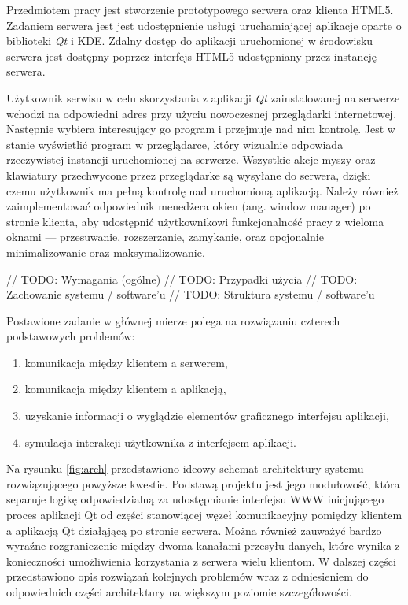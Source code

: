 Przedmiotem pracy jest stworzenie prototypowego serwera oraz klienta HTML5. Zadaniem serwera jest jest udostępnienie usługi uruchamiającej aplikacje oparte o biblioteki \emph{Qt} i KDE. Zdalny dostęp do aplikacji uruchomionej w środowisku serwera jest dostępny poprzez interfejs HTML5 udostępniany przez instancję serwera.

Użytkownik serwisu w celu skorzystania z aplikacji \emph{Qt} zainstalowanej na serwerze wchodzi na odpowiedni adres przy użyciu nowoczesnej przeglądarki internetowej. Następnie wybiera interesujący go program i przejmuje nad nim kontrolę. Jest w stanie wyświetlić program w przeglądarce, który wizualnie odpowiada rzeczywistej instancji uruchomionej na serwerze. Wszystkie akcje myszy oraz klawiatury przechwycone przez przeglądarke są wysyłane do serwera, dzięki czemu użytkownik ma pełną kontrolę nad uruchomioną aplikacją. Należy również zaimplementować odpowiednik menedżera okien (ang. window manager) po stronie klienta, aby udostępnić użytkownikowi funkcjonalność pracy z wieloma oknami --- przesuwanie, rozszerzanie, zamykanie, oraz opcjonalnie minimalizowanie oraz maksymalizowanie.

// TODO: Wymagania (ogólne)
// TODO: Przypadki użycia
// TODO: Zachowanie systemu / software'u
// TODO: Struktura systemu / software'u

Postawione zadanie w głównej mierze polega na rozwiązaniu czterech podstawowych problemów:
\begin{enumerate}
  \item komunikacja między klientem a serwerem,
  \item komunikacja między klientem a aplikacją,
  \item uzyskanie informacji o wyglądzie elementów graficznego interfejsu aplikacji,
  \item symulacja interakcji użytkownika z interfejsem aplikacji.
\end{enumerate}

Na rysunku \ref{fig:arch} przedstawiono ideowy schemat architektury systemu rozwiązującego powyższe kwestie. 
Podstawą projektu jest jego modułowość, która separuje logikę odpowiedzialną za udostępnianie interfejsu WWW inicjującego proces aplikacji Qt od części stanowiącej węzeł komunikacyjny pomiędzy klientem a aplikacją Qt działąjącą po stronie serwera.
Można również zauważyć bardzo wyraźne rozgraniczenie między dwoma kanałami przesyłu danych, które wynika z konieczności umożliwienia korzystania z serwera wielu klientom. 
W dalszej części przedstawiono opis rozwiązań kolejnych problemów wraz z odniesieniem do odpowiednich części architektury na większym poziomie szczegółowości.

